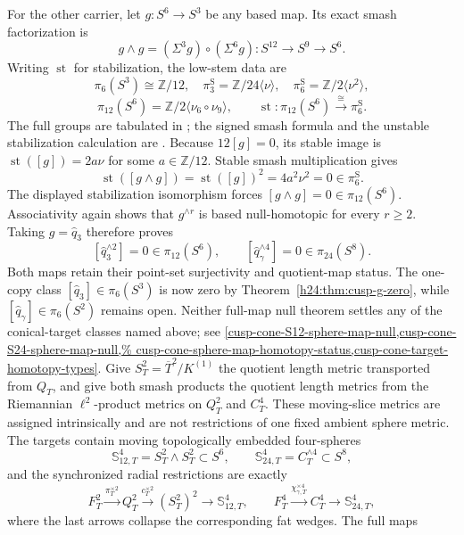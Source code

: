 \begin{enumerate}[leftmargin=1.8em,itemsep=.65em]
For the other carrier, let \(g:S^6\to S^3\) be any based map.  Its exact
smash factorization is
\[
 g\wedge g=(\Sigma^3g)\circ(\Sigma^6g):
 S^{12}\longrightarrow S^9\longrightarrow S^6.
\]
Writing \(\operatorname{st}\) for stabilization, the low-stem data are
\[
 \pi_6(S^3)\cong\mathbb Z/12,
 \quad
 \pi_3^{\mathrm S}=\mathbb Z/24\langle\nu\rangle,
 \quad
 \pi_6^{\mathrm S}=\mathbb Z/2\langle\nu^2\rangle,
\]
\[
 \pi_{12}(S^6)=\mathbb Z/2\langle\nu_6\circ\nu_9\rangle,
 \qquad
 \operatorname{st}:\pi_{12}(S^6)
 \xrightarrow{\ \cong\ }\pi_6^{\mathrm S}.
\]
The full groups are tabulated in \cite[p.~339]{Hatcher2002}; the signed smash
formula and the unstable stabilization calculation are
\cite[Propositions~3.1 and~5.11]{Toda1962}.
Because \(12[g]=0\), its stable image is
\(\operatorname{st}([g])=2a\nu\) for some \(a\in\mathbb Z/12\).  Stable
smash multiplication gives
\[
 \operatorname{st}([g\wedge g])
 =\operatorname{st}([g])^2
 =4a^2\nu^2=0\in\pi_6^{\mathrm S}.
\]
The displayed stabilization isomorphism forces
\([g\wedge g]=0\in\pi_{12}(S^6)\).
Associativity again shows that \(g^{\wedge r}\) is based null-homotopic for
every \(r\ge2\).  Taking \(g=\widehat q_3\) therefore proves
\[
 [\widehat q_3^{\wedge2}]=0\in\pi_{12}(S^6),
 \qquad
 [\widehat q_\gamma^{\wedge4}]=0\in\pi_{24}(S^8).
\]
Both maps retain their point-set surjectivity and quotient-map status.  The
one-copy class \([\widehat q_3]\in\pi_6(S^3)\) is now zero by
Theorem~\ref{h24:thm:cusp-g-zero}, while
\([\widehat q_\gamma]\in\pi_6(S^2)\) remains open. Neither full-map
null theorem settles any of the conical-target classes named above; see
\cref{cusp-cone-S12-sphere-map-null,cusp-cone-S24-sphere-map-null,%
cusp-cone-sphere-map-homotopy-status,cusp-cone-target-homotopy-types}.
Give \(S_T^2=\overline T^2/K^{(1)}\) the quotient length metric transported
from \(Q_T\), and give both smash products the quotient length metrics from
the Riemannian \(\ell^2\)-product metrics on \(Q_T^2\) and \(C_T^4\).
These moving-slice metrics are assigned intrinsically and are not restrictions
of one fixed ambient sphere metric.  The targets contain moving topologically
embedded four-spheres
\[
 \mathbb S_{12,T}^4=S_T^2\wedge S_T^2\subset S^6,
 \qquad
 \mathbb S_{24,T}^4=C_T^{\wedge4}\subset S^8,
\]
and the synchronized radial restrictions are exactly
\[
 F_T^2\xrightarrow{\pi_T^{\times2}}Q_T^2
 \xrightarrow{c_T^{\times2}}(S_T^2)^2
 \longrightarrow\mathbb S_{12,T}^4,
 \qquad
 F_T^4\xrightarrow{\chi_{\gamma,T}^{\times4}}C_T^4
 \longrightarrow\mathbb S_{24,T}^4,
\]
where the last arrows collapse the corresponding fat wedges.  The full maps

\end{enumerate}
